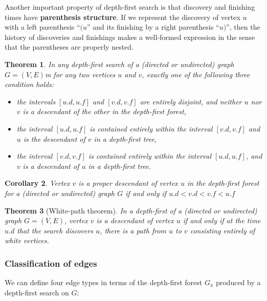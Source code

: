 \documentclass[12pt]{article}
\newtheorem{theorem}{Theorem}
\newtheorem{corollary}[theorem]{Corollary}
\begin{document}
Another important property of depth-first search is that discovery and finishing times have \textbf{parenthesis structure}. If we represent the discovery of vertex $u$ with a left parenthesis ``$(u$'' and its finishing by a right parenthesis ``$u)$'', then the history of discoveries and finishings makes a well-formed expression in the sense that the parentheses are properly nested.

\begin{theorem}
  In any depth-first search of a (directed or undirected) graph $G=(V,E)$m for any two vertices $u$ and $v$, exactly one of the following three condition holds:
  \begin{itemize}
  \item the intervals $[u.d, u.f]$ and $[v.d, v.f]$ are entirely disjoint, and neither $u$ nor $v$ is a descendant of the other in the depth-first forest,
  \item the interval $[u.d, u.f]$ is contained entirely within the interval $[v.d, v.f]$ and $u$ is the descendant of $v$ in a depth-first tree,
  \item the interval $[v.d, v.f]$ is contained entirely within the interval $[u.d, u.f]$, and $v$ is a descendant of $u$ in a depth-first tree.
  \end{itemize}
\end{theorem}

\begin{corollary}
  Vertex $v$ is a proper descendant of vertex $u$ in the depth-first forest for a (directed or undirected) graph $G$ if and only if $u.d < v.d < v.f < u.f$
\end{corollary}

\begin{theorem} [White-path theorem]
  In a depth-first of a (directed or undirected) graph $G = (V,E)$, vertex $v$ is a descendant of vertex $u$ if and only if at the time $u.d$ that the search discovers $u$, there is a path from $u$ to $v$ consisting entirely of white vertices.
\end{theorem}

\subsubsection*{Classification of edges}

We can define four edge types in terms of the depth-first forest $G_{\pi}$ produced by a depth-first search on $G$:
\end{document}
